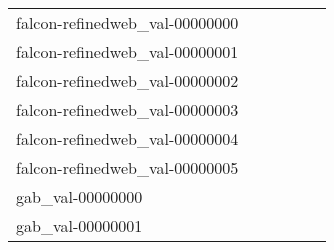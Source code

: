 {\begin{longtable}{m{6cm}m{1.7cm}m{1.7cm}m{1.7cm}m{1.7cm}m{1.7cm}}
	falcon-refinedweb\_val-00000000  & \colorbox[HTML]{fbfdd3}{\makebox[\mywidth][c]{15.92}} & \colorbox[HTML]{d7efa2}{\makebox[\mywidth][c]{15.46}} & \colorbox[HTML]{ffffe5}{\makebox[\mywidth][c]{17.14}} & \colorbox[HTML]{bee496}{\makebox[\mywidth][c]{15.37}} & \colorbox[HTML]{77c578}{\makebox[\mywidth][c]{15.22}}\\
	falcon-refinedweb\_val-00000001  & \colorbox[HTML]{fbfdd3}{\makebox[\mywidth][c]{18.49}} & \colorbox[HTML]{c5e799}{\makebox[\mywidth][c]{17.91}} & \colorbox[HTML]{ffffe5}{\makebox[\mywidth][c]{19.89}} & \colorbox[HTML]{c2e698}{\makebox[\mywidth][c]{17.90}} & \colorbox[HTML]{77c578}{\makebox[\mywidth][c]{17.71}}\\
	falcon-refinedweb\_val-00000002  & \colorbox[HTML]{fcfdd5}{\makebox[\mywidth][c]{18.45}} & \colorbox[HTML]{d0ec9e}{\makebox[\mywidth][c]{17.90}} & \colorbox[HTML]{ffffe5}{\makebox[\mywidth][c]{19.69}} & \colorbox[HTML]{d1ec9f}{\makebox[\mywidth][c]{17.91}} & \colorbox[HTML]{77c578}{\makebox[\mywidth][c]{17.68}}\\
	falcon-refinedweb\_val-00000003  & \colorbox[HTML]{fcfed9}{\makebox[\mywidth][c]{16.75}} & \colorbox[HTML]{e5f4ab}{\makebox[\mywidth][c]{16.23}} & \colorbox[HTML]{ffffe5}{\makebox[\mywidth][c]{17.92}} & \colorbox[HTML]{d9f0a3}{\makebox[\mywidth][c]{16.16}} & \colorbox[HTML]{77c578}{\makebox[\mywidth][c]{15.89}}\\
	falcon-refinedweb\_val-00000004  & \colorbox[HTML]{fdfedc}{\makebox[\mywidth][c]{16.26}} & \colorbox[HTML]{d9f0a3}{\makebox[\mywidth][c]{15.66}} & \colorbox[HTML]{ffffe5}{\makebox[\mywidth][c]{17.32}} & \colorbox[HTML]{e5f4ab}{\makebox[\mywidth][c]{15.73}} & \colorbox[HTML]{77c578}{\makebox[\mywidth][c]{15.41}}\\
	falcon-refinedweb\_val-00000005  & \colorbox[HTML]{fbfdd4}{\makebox[\mywidth][c]{15.41}} & \colorbox[HTML]{d4eea0}{\makebox[\mywidth][c]{14.96}} & \colorbox[HTML]{ffffe5}{\makebox[\mywidth][c]{16.56}} & \colorbox[HTML]{c9e99b}{\makebox[\mywidth][c]{14.92}} & \colorbox[HTML]{77c578}{\makebox[\mywidth][c]{14.74}}\\
	gab\_val-00000000  & \colorbox[HTML]{ffffe5}{\makebox[\mywidth][c]{33.19}} & \colorbox[HTML]{bee496}{\makebox[\mywidth][c]{30.55}} & \colorbox[HTML]{fdfedb}{\makebox[\mywidth][c]{31.57}} & \colorbox[HTML]{ddf1a6}{\makebox[\mywidth][c]{30.73}} & \colorbox[HTML]{77c578}{\makebox[\mywidth][c]{30.32}}\\
	gab\_val-00000001  & \colorbox[HTML]{ffffe5}{\makebox[\mywidth][c]{35.64}} & \colorbox[HTML]{a4d98a}{\makebox[\mywidth][c]{32.76}} & \colorbox[HTML]{fdfedc}{\makebox[\mywidth][c]{33.96}} & \colorbox[HTML]{addd8e}{\makebox[\mywidth][c]{32.80}} & \colorbox[HTML]{77c578}{\makebox[\mywidth][c]{32.63}}\\

\end{longtable}}
